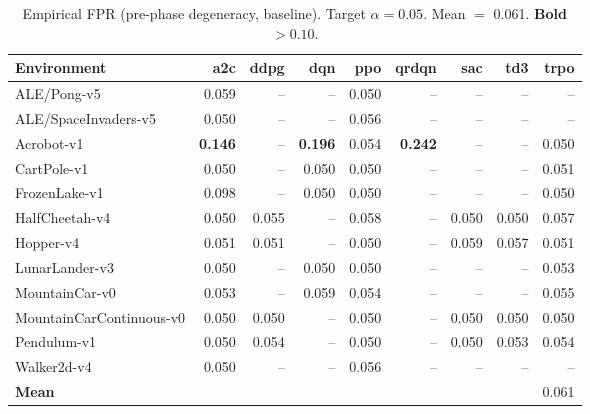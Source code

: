 \begin{table}[t]
\centering
\small
\caption{Empirical FPR (pre-phase degeneracy, baseline). Target $\alpha=0.05$. Mean $=$ 0.061. \textbf{Bold} $>0.10$.}
\label{tab:fpr}
\begin{tabular}{lrrrrrrrr}
\toprule
Environment & a2c & ddpg & dqn & ppo & qrdqn & sac & td3 & trpo \\
\midrule
ALE/Pong-v5 & 0.059 & -- & -- & 0.050 & -- & -- & -- & -- \\
ALE/SpaceInvaders-v5 & 0.050 & -- & -- & 0.056 & -- & -- & -- & -- \\
Acrobot-v1 & \textbf{0.146} & -- & \textbf{0.196} & 0.054 & \textbf{0.242} & -- & -- & 0.050 \\
CartPole-v1 & 0.050 & -- & 0.050 & 0.050 & -- & -- & -- & 0.051 \\
FrozenLake-v1 & 0.098 & -- & 0.050 & 0.050 & -- & -- & -- & 0.050 \\
HalfCheetah-v4 & 0.050 & 0.055 & -- & 0.058 & -- & 0.050 & 0.050 & 0.057 \\
Hopper-v4 & 0.051 & 0.051 & -- & 0.050 & -- & 0.059 & 0.057 & 0.051 \\
LunarLander-v3 & 0.050 & -- & 0.050 & 0.050 & -- & -- & -- & 0.053 \\
MountainCar-v0 & 0.053 & -- & 0.059 & 0.054 & -- & -- & -- & 0.055 \\
MountainCarContinuous-v0 & 0.050 & 0.050 & -- & 0.050 & -- & 0.050 & 0.050 & 0.050 \\
Pendulum-v1 & 0.050 & 0.054 & -- & 0.050 & -- & 0.050 & 0.053 & 0.054 \\
Walker2d-v4 & 0.050 & -- & -- & 0.056 & -- & -- & -- & -- \\
\midrule
\textbf{Mean} & \multicolumn{8}{r}{0.061} \\
\bottomrule
\end{tabular}
\end{table}